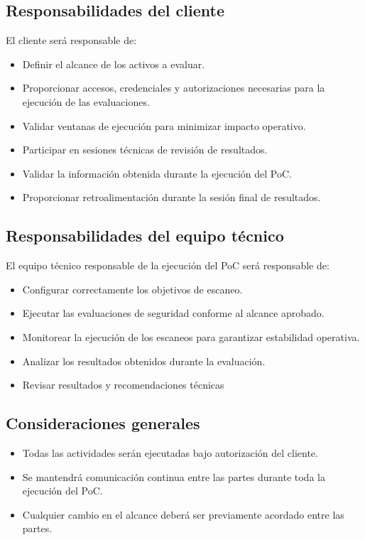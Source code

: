 \documentclass[a4paper]{article}
\begin{document}
    \subsection{Responsabilidades del cliente}
    El cliente será responsable de:\\
    \begin{itemize}
        \item Definir el alcance de los activos a evaluar.
        \item Proporcionar accesos, credenciales y autorizaciones necesarias para la ejecución de las evaluaciones.
        \item Validar ventanas de ejecución para minimizar impacto operativo.
        \item Participar en sesiones técnicas de revisión de resultados.
        \item Validar la información obtenida durante la ejecución del PoC.
        \item Proporcionar retroalimentación durante la sesión final de resultados.
    \end{itemize}

    \subsection{Responsabilidades del equipo técnico}
    El equipo técnico responsable de la ejecución del PoC será responsable de:\\
    \begin{itemize}
        \item Configurar correctamente los objetivos de escaneo.
        \item Ejecutar las evaluaciones de seguridad conforme al alcance aprobado.
        \item Monitorear la ejecución de los escaneos para garantizar estabilidad operativa.
        \item Analizar los resultados obtenidos durante la evaluación.
        \item Revisar resultados y recomendaciones técnicas
    \end{itemize}

    \subsection{Consideraciones generales}
    \begin{itemize}
        \item Todas las actividades serán ejecutadas bajo autorización del cliente.
        \item Se mantendrá comunicación continua entre las partes durante toda la ejecución del PoC.
        \item Cualquier cambio en el alcance deberá ser previamente acordado entre las partes.
    \end{itemize}
\end{document}
